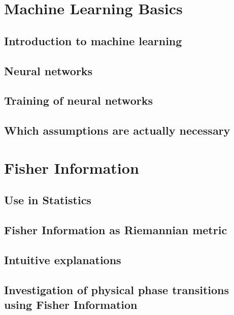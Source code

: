 \documentclass[12pt, twoside, a4paper]{report}
\begin{document}
	\chapter{Machine Learning Basics}\label{sec:ChapterMachineLearningBasics}
	\section{Introduction to machine learning}\label{sec:MachineLearningIntroduction}
	
	\section{Neural networks}\label{sec:NeuralNetworks(BigSection)}
	
	\section{Training of neural networks}\label{sec:NeuralNetworkTraining}
	
	\section{Which assumptions are actually necessary}\label{sec:WhichAssumptionsAreNecessary}
	
	
	
	\chapter{Fisher Information}\label{sec:ChapterFisherInformation}
	
	\section{Use in Statistics}\label{sec:FIinStatistics}
	
	\section{Fisher Information as Riemannian metric}\label{sec:FisherInformationAsRiemannianMetric(BigChapter)}
	
	\section{Intuitive explanations}\label{sec:FisherInterpretation}
	
	\section{Investigation of physical phase transitions using Fisher Information}\label{sec:FIPhysics}
	
	
\end{document}
